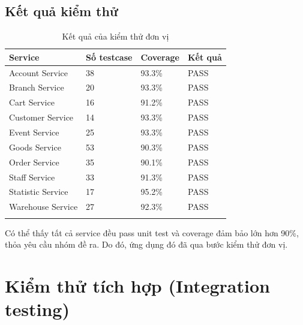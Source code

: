 \subsection{Kết quả kiểm thử}
{
    \setlength\extrarowheight{6pt}
    \begin{longtable}{| p{4cm}| p{4cm}| p{4cm}| p{4cm} |}
        \hline
        \textbf{Service} &  \textbf{Số testcase}  & \textbf{Coverage} & \textbf{Kết quả} \\
        \hline
        Account Service  &  38  & 93.3\%            & PASS             \\
        \hline
        Branch Service  &  20  & 93.3\%            & PASS             \\
        \hline
        Cart Service  &  16   & 91.2\%            & PASS             \\
        \hline
        Customer Service  &  14  & 93.3\%            & PASS             \\
        \hline
        Event Service  &   25   & 93.3\%            & PASS             \\
        \hline
        Goods Service  &   53   & 90.3\%            & PASS             \\
        \hline
        Order Service  &   35   & 90.1\%            & PASS             \\
        \hline
        Staff Service  &  33   & 91.3\%            & PASS             \\
        \hline
        Statistic Service  & 17 & 95.2\%            & PASS             \\
        \hline
        Warehouse Service  &  27  & 92.3\%            & PASS             \\
        \hline
        \caption{Kết quả của kiểm thử đơn vị}
    \end{longtable}
}

Có thể thấy tất cả service đều pass unit test và coverage đảm bảo lớn hơn 90\%, thỏa yêu cầu nhóm đề ra. Do đó, ứng dụng đó đã qua bước kiểm thử đơn vị.

\newpage
\section{Kiểm thử tích hợp (Integration testing)}
